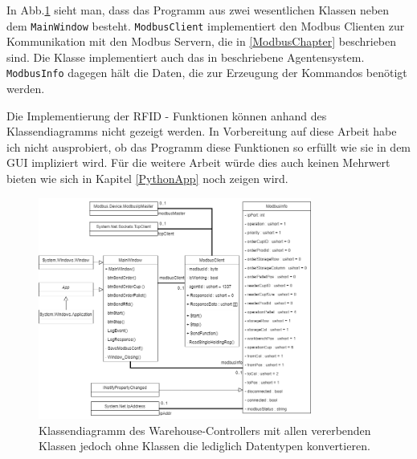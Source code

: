 In Abb.\ref{fig:figure6} sieht man, dass das Programm aus zwei wesentlichen Klassen neben dem \verb|MainWindow| besteht.
\verb|ModbusClient| implementiert den Modbus Clienten zur Kommunikation mit den Modbus Servern, die in \ref{ModbusChapter}
beschrieben sind. Die Klasse implementiert auch das in \cite{LarsKistner2016} beschriebene Agentensystem.
\verb|ModbusInfo| dagegen hält die Daten, die zur Erzeugung der Kommandos benötigt werden.

Die Implementierung der RFID - Funktionen können anhand des Klassendiagramms nicht gezeigt werden.
In Vorbereitung auf diese Arbeit habe ich nicht ausprobiert, ob das Programm diese Funktionen so erfüllt wie sie in dem
GUI impliziert wird. Für die weitere Arbeit würde dies auch keinen Mehrwert bieten wie sich in Kapitel \ref{PythonApp}
noch zeigen wird.

\begin{figure}
    \caption[Klassendiagramm des Controllers ]
    {\small Klassendiagramm des Warehouse-Controllers mit allen vererbenden Klassen jedoch ohne Klassen die
    lediglich Datentypen konvertieren.}\label{fig:figure6}
    \includegraphics[width = 0.8\textwidth ]{Bilder/C_Klassendiagramm}
    \centering
\end{figure}

